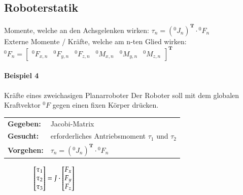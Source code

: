 \subsection{Roboterstatik}
Momente, welche an den Achsgelenken wirken:\newline
$\tau_{n}=({}^0J_n)^\textbf{T} \cdot {}^0F_n$  \\
Externe Momente / Kräfte, welche am n-ten Glied wirken:\newline
${}^0F_n = \begin{bmatrix} {}^0F_{x,n} & {}^0F_{y,n} & {}^0F_{z,n} & {}^0M_{x,n}
& {}^0M_{y,n} & {}^0M_{z,n}
\end{bmatrix}^{\textbf{T}} $ \newline
\paragraph{Beispiel 4} Kräfte eines zweichasigen Planarroboter\newline
Der Roboter soll mit dem globalen Kraftvektor ${}^0F$ gegen einen fixen Körper drücken.\newline
\null\hspace{0.5cm}\begin{tabular}{ll}
    \textbf{Gegeben:}& Jacobi-Matrix\\
    \textbf{Gesucht:}& erforderliches Antriebsmoment $\tau_1$ und $\tau_2$\\
    \textbf{Vorgehen:} & $\tau_{n}=({}^0J_n)^\textbf{T} \cdot {}^0F_n$  \\
\end{tabular}$\null \qquad\qquad
\begin{bmatrix}
\tau_{1} \\ \tau_{2} \\ \tau_{3}
\end{bmatrix}          
=  J \cdot
\begin{bmatrix}
F_{x} \\ F_{y} \\ F_{z}
\end{bmatrix}
$
\clearpage

